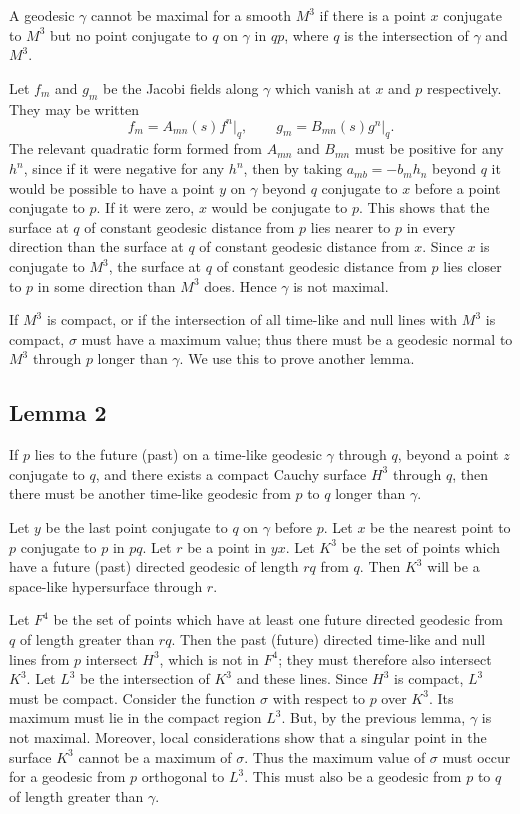 A geodesic $\gamma$ cannot be maximal for a smooth $M^3$ if there is a point
$x$ conjugate to $M^3$ but no point conjugate to $q$ on $\gamma$ in $qp$,
where $q$ is the intersection of $\gamma$ and $M^3$.

Let $f_m$ and $g_m$ be the Jacobi fields along $\gamma$ which vanish at $x$
and $p$ respectively. They may be written
\[
f_m=A_{mn}(s)f^n\big|_q,
\qquad
g_m=B_{mn}(s)g^n\big|_q.
\]
The relevant quadratic form formed from $A_{mn}$ and $B_{mn}$ must be
positive for any $h^n$, since if it were negative for any $h^n$, then by
taking $a_{mb}=-b_mh_n$ beyond $q$ it would be possible to have a point $y$
on $\gamma$ beyond $q$ conjugate to $x$ before a point conjugate to $p$. If
it were zero, $x$ would be conjugate to $p$. This shows that the surface at
$q$ of constant geodesic distance from $p$ lies nearer to $p$ in every
direction than the surface at $q$ of constant geodesic distance from $x$.
Since $x$ is conjugate to $M^3$, the surface at $q$ of constant geodesic
distance from $p$ lies closer to $p$ in some direction than $M^3$ does.
Hence $\gamma$ is not maximal.

If $M^3$ is compact, or if the intersection of all time-like and null lines
with $M^3$ is compact, $\sigma$ must have a maximum value; thus there must be
a geodesic normal to $M^3$ through $p$ longer than $\gamma$. We use this to
prove another lemma.

\subsection*{Lemma 2}

If $p$ lies to the future (past) on a time-like geodesic $\gamma$ through
$q$, beyond a point $z$ conjugate to $q$, and there exists a compact Cauchy
surface $H^3$ through $q$, then there must be another time-like geodesic from
$p$ to $q$ longer than $\gamma$.

Let $y$ be the last point conjugate to $q$ on $\gamma$ before $p$. Let $x$ be
the nearest point to $p$ conjugate to $p$ in $pq$. Let $r$ be a point in
$yx$. Let $K^3$ be the set of points which have a future (past) directed
geodesic of length $rq$ from $q$. Then $K^3$ will be a space-like
hypersurface through $r$.

Let $F^4$ be the set of points which have at least one future directed
geodesic from $q$ of length greater than $rq$. Then the past (future) directed
time-like and null lines from $p$ intersect $H^3$, which is not in $F^4$;
they must therefore also intersect $K^3$. Let $L^3$ be the intersection of
$K^3$ and these lines. Since $H^3$ is compact, $L^3$ must be compact.
Consider the function $\sigma$ with respect to $p$ over $K^3$. Its maximum
must lie in the compact region $L^3$. But, by the previous lemma, $\gamma$ is
not maximal. Moreover, local considerations show that a singular point in the
surface $K^3$ cannot be a maximum of $\sigma$. Thus the maximum value of
$\sigma$ must occur for a geodesic from $p$ orthogonal to $L^3$. This must
also be a geodesic from $p$ to $q$ of length greater than $\gamma$.

